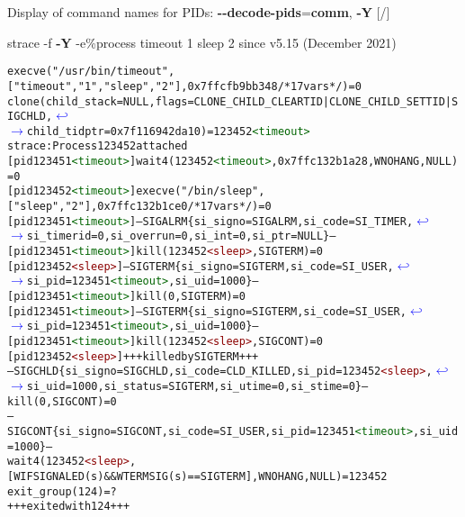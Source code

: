 \documentclass[unicode,aspectratio=169,xcolor={table,dvipsnames,usernames}]{beamer}
\newcommand{\symlinebreak}{\textcolor{blue}{\(\hookleftarrow\)}}
\newcommand{\symlinecont}{\textcolor{blue}{\(\longrightarrow\)}}
\begin{document}
\begin{frame}[fragile]{Display of command names for PIDs: \textbf{-{}-decode-pids}=\textbf{comm}, \textbf{-Y} \hfill [\insertframenumber/\inserttotalframenumber]}
\small
\begin{block}{strace -f \textbf{-Y} -e\%process timeout 1 sleep 2 \hfill since v5.15 (December 2021)}
\scriptsize
\begin{alltt}
execve("/usr/bin/timeout", ["timeout", "1", "sleep", "2"], 0x7ffcfb9bb348 /* 17 vars */) = 0
clone(child_stack=NULL, flags=CLONE_CHILD_CLEARTID|CLONE_CHILD_SETTID|SIGCHLD, \symlinebreak
\symlinecont child_tidptr=0x7f116942da10) = 123452\textcolor{darkgreen}{<timeout>}
strace: Process 123452 attached
[pid 123451\textcolor{darkgreen}{<timeout>}] wait4(123452\textcolor{darkgreen}{<timeout>}, 0x7ffc132b1a28, WNOHANG, NULL) = 0
[pid 123452\textcolor{darkgreen}{<timeout>}] execve("/bin/sleep", ["sleep", "2"], 0x7ffc132b1ce0 /* 17 vars */) = 0
[pid 123451\textcolor{darkgreen}{<timeout>}] --- SIGALRM \{si_signo=SIGALRM, si_code=SI_TIMER, \symlinebreak
\symlinecont si_timerid=0, si_overrun=0, si_int=0, si_ptr=NULL\} ---
[pid 123451\textcolor{darkgreen}{<timeout>}] kill(123452\textcolor{darkred}{<sleep>}, SIGTERM) = 0
[pid 123452\textcolor{darkred}{<sleep>}] --- SIGTERM \{si_signo=SIGTERM, si_code=SI_USER, \symlinebreak
\symlinecont si_pid=123451\textcolor{darkgreen}{<timeout>}, si_uid=1000\} ---
[pid 123451\textcolor{darkgreen}{<timeout>}] kill(0, SIGTERM) = 0
[pid 123451\textcolor{darkgreen}{<timeout>}] --- SIGTERM \{si_signo=SIGTERM, si_code=SI_USER, \symlinebreak
\symlinecont si_pid=123451\textcolor{darkgreen}{<timeout>}, si_uid=1000\} ---
[pid 123451\textcolor{darkgreen}{<timeout>}] kill(123452\textcolor{darkred}{<sleep>}, SIGCONT) = 0
[pid 123452\textcolor{darkred}{<sleep>}] +++ killed by SIGTERM +++
--- SIGCHLD \{si_signo=SIGCHLD, si_code=CLD_KILLED, si_pid=123452\textcolor{darkred}{<sleep>}, \symlinebreak
\symlinecont si_uid=1000, si_status=SIGTERM, si_utime=0, si_stime=0\} ---
kill(0, SIGCONT)                        = 0
--- SIGCONT \{si_signo=SIGCONT, si_code=SI_USER, si_pid=123451\textcolor{darkgreen}{<timeout>}, si_uid=1000\} ---
wait4(123452\textcolor{darkred}{<sleep>}, [{WIFSIGNALED(s) && WTERMSIG(s) == SIGTERM}], WNOHANG, NULL) = 123452
exit_group(124)                         = ?
+++ exited with 124 +++
\end{alltt}
\end{block}
\end{frame}
\end{document}
